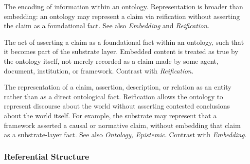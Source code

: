 \begin{description}[style=nextline,leftmargin=1.5cm]

\item[Representation]
The encoding of information within an ontology.
Representation is broader than embedding:
an ontology may represent a claim via reification
without asserting the claim as a foundational fact.
See also \emph{Embedding} and \emph{Reification}.

\item[Embedding]
The act of asserting a claim as a foundational fact within an ontology,
such that it becomes part of the substrate layer.
Embedded content is treated as true by the ontology itself,
not merely recorded as a claim made by some agent,
document, institution, or framework.
Contrast with \emph{Reification}.

\item[Reification]
The representation of a claim, assertion, description,
or relation as an entity rather than as a direct ontological fact.
Reification allows the ontology to represent discourse
about the world without asserting contested conclusions
about the world itself.
For example, the substrate may represent that a framework
asserted a causal or normative claim,
without embedding that claim as a substrate-layer fact.
See also \emph{Ontology, Epistemic}.
Contrast with \emph{Embedding}.

\end{description}

\subsubsection*{Referential Structure}

